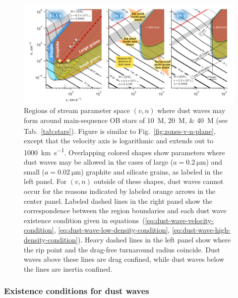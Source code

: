 \message{ !name(dusty-bow-wave.tex)}\documentclass[useAMS, usenatbib, a4paper]{mnras}
\begin{document}
\begin{figure}
  \centering
  \includegraphics[width=\linewidth]{figs/existence-dust-wave}
  \caption{Regions of stream parameter space \((v, n)\) where dust
    waves may form around main-sequence OB stars of
    \SIlist{10;20;40}{M_\odot} (see Tab.~\ref{tab:stars}).  Figure is
    similar to Fig.~\ref{fig:zones-v-n-plane}, except that the
    velocity axis is logarithmic and extends out to
    \SI{1000}{km.s^{-1}}.  Overlapping colored shapes show parameters
    where dust waves may be allowed in the cases of large
    (\(a = \SI{0.2}{\um}\)) and small (\(a = \SI{0.02}{\um}\))
    graphite and silicate grains, as labeled in the left panel.  For
    \((v, n)\) outside of these shapes, dust waves cannot occur for
    the reasons indicated by labeled orange arrows in the center
    panel.  Labeled dashed lines in the right panel show the
    correspondence between the region boundaries and each dust wave
    existence condition given in
    equations~(\ref{eq:dust-wave-velocity-condition},
    \ref{eq:dust-wave-low-density-condition},
    \ref{eq:dust-wave-high-density-condition}). Heavy dashed lines in
    the left panel show where the rip point and the drag-free
    turnaround radius coincide.  Dust waves above these lines are drag
    confined, while dust waves below the lines are inertia confined.
  }
  \label{fig:existence-dust-wave}
\end{figure}

\subsubsection{Existence conditions for dust waves}
\label{sec:exist-cond-separ}
\end{document}
